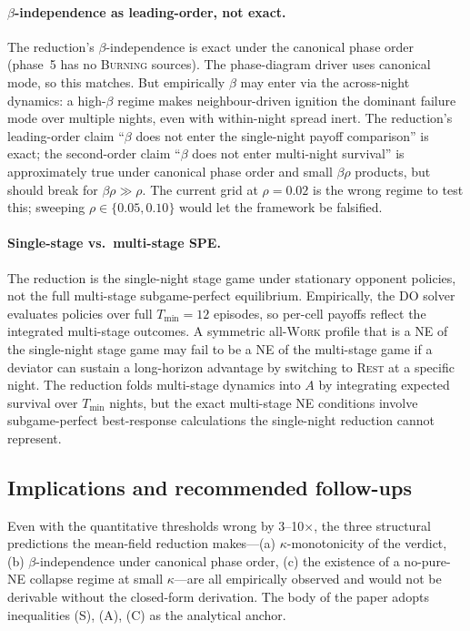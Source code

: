 \documentclass{anvil-paper}
\begin{document}
\paragraph{$\beta$-independence as leading-order, not exact.}
The reduction's $\beta$-independence is exact under the canonical phase
order (phase~5 has no \textsc{Burning} sources). The phase-diagram
driver uses canonical mode, so this matches. But empirically $\beta$
may enter via the across-night dynamics: a high-$\beta$ regime makes
neighbour-driven ignition the dominant failure mode over multiple
nights, even with within-night spread inert. The reduction's
leading-order claim ``$\beta$ does not enter the single-night payoff
comparison'' is exact; the second-order claim ``$\beta$ does not enter
multi-night survival'' is approximately true under canonical phase
order and small $\beta\rho$ products, but should break for
$\beta\rho\gg\rho$. The current grid at $\rho{=}0.02$ is the wrong
regime to test this; sweeping $\rho\in\{0.05,0.10\}$ would let the
framework be falsified.

\paragraph{Single-stage vs.\ multi-stage SPE.}
The reduction is the single-night stage game under stationary opponent
policies, not the full multi-stage subgame-perfect equilibrium.
Empirically, the DO solver evaluates policies over full
$T_{\min}{=}12$ episodes, so per-cell payoffs reflect the integrated
multi-stage outcomes. A symmetric all-\textsc{Work} profile that is a
NE of the single-night stage game may fail to be a NE of the
multi-stage game if a deviator can sustain a long-horizon advantage by
switching to \textsc{Rest} at a specific night. The reduction folds
multi-stage dynamics into $A$ by integrating expected survival over
$T_{\min}$ nights, but the exact multi-stage NE conditions involve
subgame-perfect best-response calculations the single-night reduction
cannot represent.

\subsection{Implications and recommended follow-ups}
\label{app:nestructure:followups}

Even with the quantitative thresholds wrong by 3--10$\times$, the three
structural predictions the mean-field reduction makes---(a)
$\kappa$-monotonicity of the verdict, (b) $\beta$-independence under
canonical phase order, (c) the existence of a no-pure-NE collapse
regime at small $\kappa$---are all empirically observed and would not
be derivable without the closed-form derivation. The body of the paper
adopts inequalities (S), (A), (C) as the analytical anchor.
\end{document}
